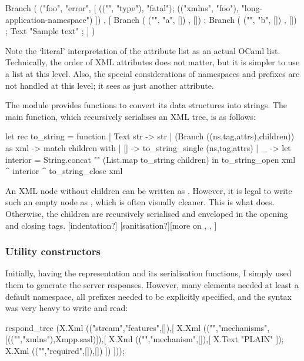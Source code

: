 \begin{ocaml}
Branch ( ("foo", "error", [
    (("", "type"), "fatal");
    (("xmlns", "foo"), "long-application-namespace")
  ]) , [
    Branch ( ("", "a", []) , []) ;
    Branch ( ("", "b", []) , []) ;
    Text "Sample text" ;
] )
\end{ocaml}

Note the `literal' interpretation of the attribute list as an actual OCaml list. Technically, the order of XML attributes does not matter, but it is simpler to use a list at this level. Also, the special considerations of namespaces and prefixes are not handled at this level; it sees  as just another attribute.

The  module provides functions to convert its data structures into strings. The main  function, which recursively serialises an XML tree, is as follows:

\begin{ocaml}
let rec to_string = function
  | Text str -> str
  | (Branch ((ns,tag,attrs),children)) as xml ->
    match children with
    | [] -> to_string_single (ns,tag,attrs)
    | _  -> let interior = String.concat "" (List.map to_string children) in
            to_string_open xml ^ interior ^ to_string_close xml
\end{ocaml}

An XML node without children can be written as . However, it is legal to write such an empty node as , which is often visually cleaner. This is what  does. Otherwise, the children are recursively serialised and enveloped in the opening and closing tags. [indentation?] [sanitisation?][more on , , ]

\subsubsection{Utility constructors}
Initially, having the  representation and its serialisation functions, I simply used them to generate the server responses. However, many elements needed at least a default namespace, all prefixes needed to be explicitly specified, and the syntax was very heavy to write and read:

\begin{ocaml}
respond_tree
  (X.Xml (("stream","features",[]),[
    X.Xml (("","mechanisms",[(("","xmlns"),Xmpp.sasl)]),[
        X.Xml (("","mechanism",[]),[ X.Text "PLAIN" ]);
        X.Xml (("","required",[]),[])
      ])
  ]));
\end{ocaml}

